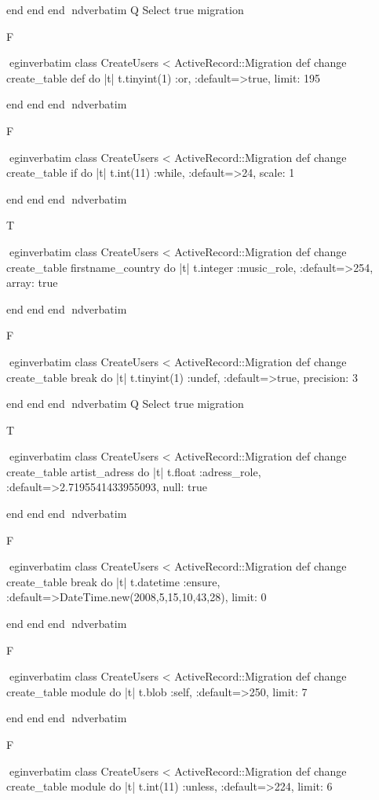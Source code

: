     end 
  end 
end
nd{verbatim}
Q
 Select true migration

F

egin{verbatim}
 class CreateUsers < ActiveRecord::Migration 
  def change 
    create_table def do |t| 
      t.tinyint(1) :or, :default=>true, limit: 195
    
    end 
  end 
end
nd{verbatim}

F

egin{verbatim}
 class CreateUsers < ActiveRecord::Migration 
  def change 
    create_table if do |t| 
      t.int(11) :while, :default=>24, scale: 1
    
    end 
  end 
end
nd{verbatim}

T

egin{verbatim}
 class CreateUsers < ActiveRecord::Migration 
  def change 
    create_table firstname_country do |t| 
      t.integer :music_role, :default=>254, array: true
    
    end 
  end 
end
nd{verbatim}

F

egin{verbatim}
 class CreateUsers < ActiveRecord::Migration 
  def change 
    create_table break do |t| 
      t.tinyint(1) :undef, :default=>true, precision: 3
    
    end 
  end 
end
nd{verbatim}
Q
 Select true migration

T

egin{verbatim}
 class CreateUsers < ActiveRecord::Migration 
  def change 
    create_table artist_adress do |t| 
      t.float :adress_role, :default=>2.7195541433955093, null: true
    
    end 
  end 
end
nd{verbatim}

F

egin{verbatim}
 class CreateUsers < ActiveRecord::Migration 
  def change 
    create_table break do |t| 
      t.datetime :ensure, :default=>DateTime.new(2008,5,15,10,43,28), limit: 0
    
    end 
  end 
end
nd{verbatim}

F

egin{verbatim}
 class CreateUsers < ActiveRecord::Migration 
  def change 
    create_table module do |t| 
      t.blob :self, :default=>250, limit: 7
    
    end 
  end 
end
nd{verbatim}

F

egin{verbatim}
 class CreateUsers < ActiveRecord::Migration 
  def change 
    create_table module do |t| 
      t.int(11) :unless, :default=>224, limit: 6
    
